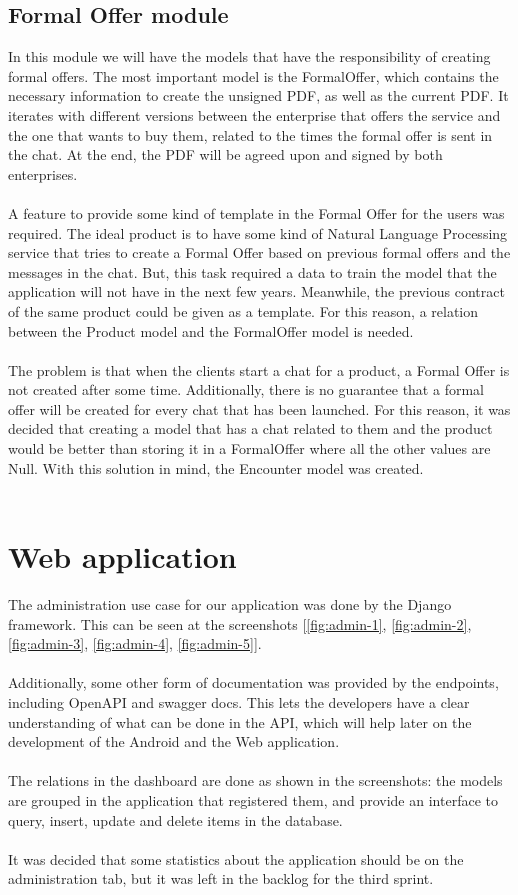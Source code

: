 \documentclass[./main.tex]{subfiles}
\begin{document}
\subsection{Formal Offer module}
In this module we will have the models that have the responsibility of
creating formal offers. The most important model is the FormalOffer,
which contains the necessary information to create the unsigned PDF, as
well as the current PDF. It iterates with different versions between the
enterprise that offers the service and the one that wants to buy them,
related to the times the formal offer is sent in the chat. At the end,
the PDF will be agreed upon and signed by both enterprises.
\\
\\
A feature to provide some kind of template in the Formal Offer for the
users was required. The ideal product is to have some kind of Natural
Language Processing service that tries to create a Formal Offer based on
previous formal offers and the messages in the chat. But, this task
required a data to train the model that the application will not have in
the next few years. Meanwhile, the previous contract of the same product
could be given as a template. For this reason, a relation between the
Product model and the FormalOffer model is needed.
\\
\\
The problem is that when the clients start a chat for a product, a
Formal Offer is not created after some time. Additionally, there is no
guarantee that a formal offer will be created for every chat that has
been launched. For this reason, it was decided that creating a model
that has a chat related to them and the product would be better than
storing it in a FormalOffer where all the other values are Null. With
this solution in mind, the Encounter model was created.
\\
\\
\section{Web application}
The administration use case for our application was
done by the Django framework. This can be seen at the screenshots [\ref{fig:admin-1}, \ref{fig:admin-2}, 
\ref{fig:admin-3}, \ref{fig:admin-4}, \ref{fig:admin-5}].
\\
\\
Additionally, some other
form of documentation was provided by the endpoints, including OpenAPI
and swagger docs. This lets the developers have a clear understanding of
what can be done in the API, which will help later on the development of
the Android and the Web application.
\\
\\
The relations in the dashboard are done as shown in the screenshots: the
models are grouped in the application that registered them, and provide
an interface to query, insert, update and delete items in the database.
\\
\\
It was decided that some statistics about the application should be on
the administration tab, but it was left in the backlog for the third
sprint.
\end{document}
